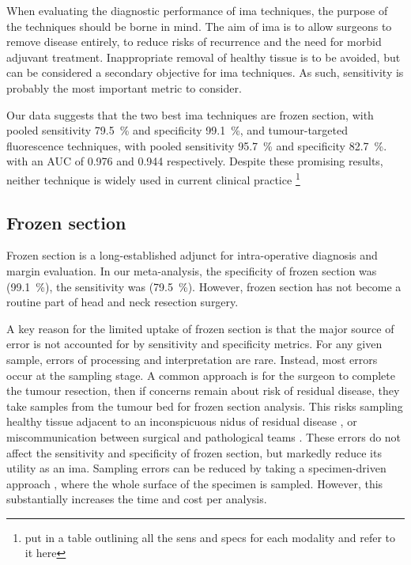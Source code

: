 When evaluating the diagnostic performance of \gls{ima} techniques, the purpose of the techniques should be borne in mind. 
The aim of \gls{ima} is to allow surgeons to remove disease entirely, to reduce risks of recurrence and the need for morbid adjuvant treatment.
Inappropriate removal of healthy tissue is to be avoided, but can be considered a secondary objective for \gls{ima} techniques.
As such, sensitivity is probably the most important metric to consider.

Our data suggests that the two best \gls{ima} techniques are frozen section, with pooled sensitivity \SI{79.5}{\percent} and specificity \SI{99.1}{\percent}, and tumour-targeted fluorescence techniques, with pooled sensitivity \SI{95.7}{\percent} and specificity \SI{82.7}{\percent}.
with an AUC of 0.976 and 0.944 respectively.
Despite these promising results, neither technique is widely used in current clinical practice
\footnote{put in a table outlining all the sens and specs for each modality and refer to it here}

\subsection{Frozen section}

Frozen section is a long-established adjunct for intra-operative diagnosis and margin evaluation.
In our meta-analysis, the specificity of frozen section was (\SI{99.1}{\percent}), the sensitivity was (\SI{79.5}{\percent}).
However, frozen section has not become a routine part of head and neck resection surgery.

A key reason for the limited uptake of frozen section is that the major source of error is not accounted for by sensitivity and specificity metrics.
For any given sample, errors of processing and interpretation are rare.
Instead, most errors occur at the sampling stage.
A common approach is for the surgeon to complete the tumour resection, then if concerns remain about risk of residual disease, they take samples from the tumour bed for frozen section analysis\cite{layfieldFrozenSectionEvaluation2018}.
This risks sampling healthy tissue adjacent to an inconspicuous nidus of residual disease \cite{due.RefiningUtilityRole2016}, or miscommunication between surgical and pathological teams \cite{blackc.CriticalEvaluationFrozen2006}.
These errors do not affect the sensitivity and specificity of frozen section, but markedly reduce its utility as an \gls{ima}.
Sampling errors can be reduced by taking a specimen-driven approach \cite{maxwellEarlyOralTongue2015}, where the whole surface of the specimen is sampled.
However, this substantially increases the time and cost per analysis.

